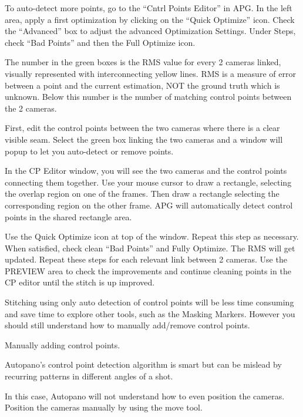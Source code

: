 \begin{fullwidth}

To auto-detect more points, go to the “Cntrl Points Editor” in APG. In the left area, apply a first optimization by clicking on the “Quick Optimize” icon. Check the  “Advanced” box to adjust the advanced Optimization Settings. Under Steps, check “Bad Points” and then the Full Optimize icon.


The number in the green boxes is the RMS value for every 2 cameras linked, visually represented with interconnecting yellow lines. RMS is a measure of error between a point and the current estimation, NOT the ground truth which is unknown. Below this number is the number of matching control points between the 2 cameras.


First, edit the control points between the two cameras where there is a clear visible seam. Select the green box linking the two cameras and a window will popup to let you auto-detect or remove points.

In the CP Editor window, you will see the two cameras and the control points connecting them together. Use your mouse cursor to draw a rectangle, selecting the overlap region on one of the frames. Then draw a rectangle selecting the corresponding region on the other frame. APG will automatically detect control points in the shared rectangle area. 


Use the Quick Optimize icon at top of the window. Repeat this step as necessary. When satisfied, check clean “Bad Points” and Fully Optimize. The RMS will get updated. Repeat these steps for each relevant link between 2 cameras. Use the PREVIEW area to check the improvements and continue cleaning points in the CP editor until the stitch is up improved.

Stitching using only auto detection of control points will be less time consuming and save time to explore other tools, such as the Masking Markers. However you should still understand how to manually add/remove control points. 

\clearpage
{\large Manually adding control points. \par}

Autopano’s control point detection algorithm is smart but can be mislead by recurring patterns in different angles of a shot. 

In this case, Autopano will not understand how to even position the cameras. Position the cameras manually by using the move tool. 


\end{fullwidth}

